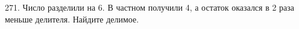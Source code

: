 271. Число разделили на 6. В частном получили 4, а остаток оказался в 2 раза меньше делителя. Найдите делимое.\\
